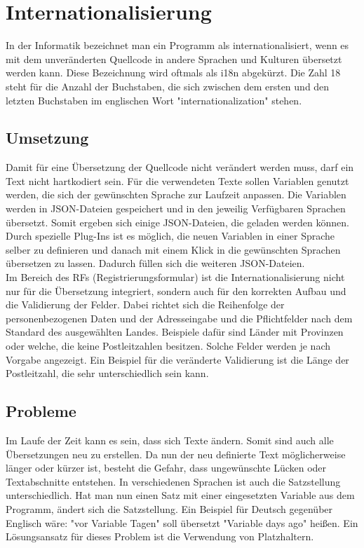 \chapter{Internationalisierung}
In der Informatik bezeichnet man ein Programm als internationalisiert, wenn es mit dem unveränderten Quellcode in andere Sprachen und Kulturen übersetzt werden kann. Diese Bezeichnung wird oftmals als i18n abgekürzt. Die Zahl 18 steht für die Anzahl der Buchstaben, die sich zwischen dem ersten und den letzten Buchstaben im englischen Wort "internationalization" stehen. \autocite{wikii18n}
\section{Umsetzung}
Damit für eine Übersetzung der Quellcode nicht verändert werden muss, darf ein Text nicht hartkodiert sein. Für die verwendeten Texte sollen Variablen genutzt werden, die sich der gewünschten Sprache zur Laufzeit anpassen. Die Variablen werden in JSON-Dateien gespeichert und in den jeweilig Verfügbaren Sprachen übersetzt. Somit ergeben sich einige JSON-Dateien, die geladen werden können. Durch spezielle Plug-Ins ist es möglich, die neuen Variablen in einer Sprache selber zu definieren und danach mit einem Klick in die gewünschten Sprachen übersetzen zu lassen. Dadurch füllen sich die weiteren JSON-Dateien.\autocite{wikii18n}\\
Im Bereich des RFs (Registrierungsformular) ist die Internationalisierung nicht nur für die Übersetzung integriert, sondern auch für den korrekten Aufbau und die Validierung der Felder. Dabei richtet sich die Reihenfolge der personenbezogenen Daten und der Adresseingabe und die Pflichtfelder nach dem Standard des ausgewählten Landes. Beispiele dafür sind Länder mit Provinzen oder welche, die keine Postleitzahlen besitzen. Solche Felder werden je nach Vorgabe angezeigt. Ein Beispiel für die veränderte Validierung ist die Länge der Postleitzahl, die sehr unterschiedlich sein kann.\autocite{wikii18n}
\section{Probleme}
Im Laufe der Zeit kann es sein, dass sich Texte ändern. Somit sind auch alle Übersetzungen neu zu erstellen. Da nun der neu definierte Text möglicherweise länger oder kürzer ist, besteht die Gefahr, dass ungewünschte Lücken oder Textabschnitte entstehen. In verschiedenen Sprachen ist auch die Satzstellung unterschiedlich. Hat man nun einen Satz mit einer eingesetzten Variable aus dem Programm, ändert sich die Satzstellung. Ein Beispiel für Deutsch gegenüber Englisch wäre: "vor {Variable} Tagen" soll übersetzt "{Variable} days ago" heißen. Ein Lösungsansatz für dieses Problem ist die Verwendung von Platzhaltern.\autocite{wikii18n}